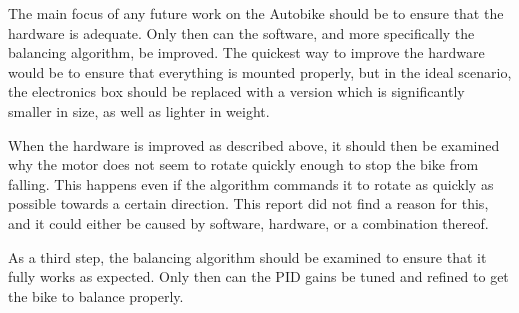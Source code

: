 The main focus of any future work on the Autobike should be to ensure that the hardware is adequate. Only then can the software, and more specifically the balancing algorithm, be improved. The quickest way to improve the hardware would be to ensure that everything is mounted properly, but in the ideal scenario, the electronics box should be replaced with a version which is significantly smaller in size, as well as lighter in weight.

When the hardware is improved as described above, it should then be examined why the motor does not seem to rotate quickly enough to stop the bike from falling. This happens even if the algorithm commands it to rotate as quickly as possible towards a certain direction. This report did not find a reason for this, and it could either be caused by software, hardware, or a combination thereof.

As a third step, the balancing algorithm should be examined to ensure that it fully works as expected. Only then can the PID gains be tuned and refined to get the bike to balance properly.